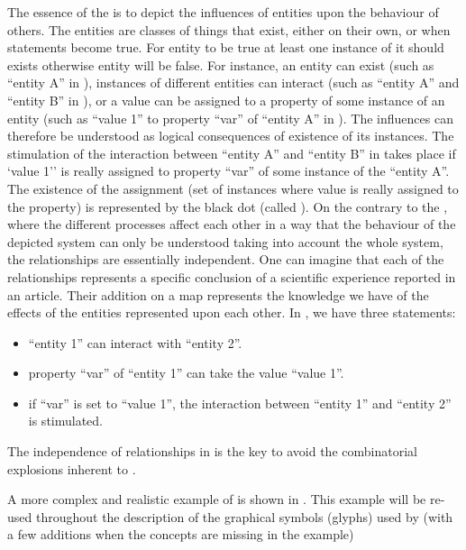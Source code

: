 The essence of the \ERs is to depict the influences of entities upon the behaviour of others. The entities are classes of things that exist, either on their own, or when statements become true. For entity to be true at least one instance of it should exists otherwise entity will be false. For instance, an entity can exist (such as ``entity A'' in ), instances of different entities can interact (such as ``entity A'' and ``entity B'' in ), or a value can be assigned to a property of some instance of an entity (such as ``value 1'' to property ``var'' of ``entity A'' in ). The influences can therefore be understood as logical consequences of existence of its instances. The stimulation of the interaction between ``entity A'' and ``entity B'' in  takes place if `value 1'' is really assigned to property ``var'' of some instance of the ``entity A''. The existence of the assignment (set of instances where value is really assigned to the property) is represented by the black dot (called ). On the contrary to the \PDl, where the different processes affect each other in a way that the behaviour of the depicted system can only be understood taking into account the whole system, the relationships are essentially independent. One can imagine that each of the relationships represents a specific conclusion of a scientific experience reported in an article. Their addition on a map represents the knowledge we have of the effects of the entities represented upon each other. In  , we have three statements: 

\begin{itemize}
 \item ``entity 1'' can interact with ``entity 2''.
 \item property ``var'' of ``entity 1'' can take the value ``value 1''.
 \item if ``var'' is set to ``value 1'', the interaction between ``entity 1'' and ``entity 2'' is stimulated.
\end{itemize}


The independence of relationships in \ERs is the key to avoid the combinatorial explosions inherent to \PDs.

A more complex and realistic example of \ERm is shown in . This example will be re-used throughout the description of the graphical symbols (glyphs) used by \SBGNERLone (with a few additions when the concepts are missing in the example) 

